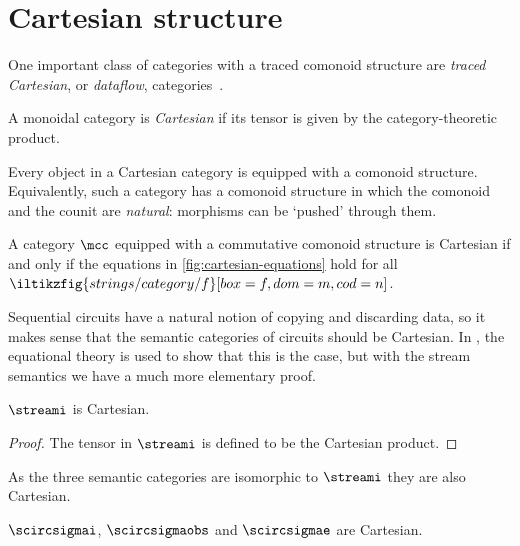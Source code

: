 \section{Cartesian structure}\label{sec:cartesian-structure}

One important class of categories with a traced comonoid structure are
\emph{traced Cartesian}, or \emph{dataflow},
categories~\cite{cazanescu1990new}.

\begin{definition}
    A monoidal category is \emph{Cartesian} if its tensor is given by the
    category-theoretic product.
\end{definition}

Every object in a Cartesian category is equipped with a comonoid structure.
Equivalently, such a category has a comonoid structure in which the comonoid and
the counit are \emph{natural}: morphisms can be `pushed' through them.

\begin{theorem}
    A category \(\mcc\) equipped with a commutative comonoid structure is
    Cartesian if and only if the equations in \cref{fig:cartesian-equations}
    hold for all \(\iltikzfig{strings/category/f}[box=f,dom=m,cod=n]\).
\end{theorem}



Sequential circuits have a natural notion of copying and discarding data, so it
makes sense that the semantic categories of circuits should be Cartesian.
In \cite{ghica2016categorical}, the equational theory is used to show that this
is the case, but with the stream semantics we have a much more elementary proof.

\begin{theorem}
    \(\streami\) is Cartesian.
\end{theorem}
\begin{proof}
    The tensor in \(\streami\) is defined to be the Cartesian product.
\end{proof}

As the three semantic categories are isomorphic to \(\streami\) they are also
Cartesian.

\begin{corollary}
    \(\scircsigmai\), \(\scircsigmaobs\) and \(\scircsigmae\) are Cartesian.
\end{corollary}

